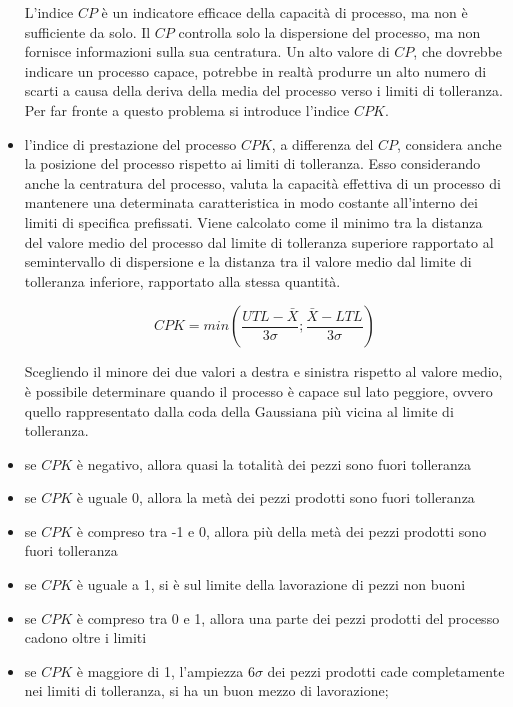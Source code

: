 \begin{itemize}
L'indice $CP$ è un indicatore efficace della capacità di processo, ma non è sufficiente da solo. 
Il $CP$ controlla solo la dispersione del processo, ma non fornisce informazioni sulla sua centratura. 
Un alto valore di $CP$, che dovrebbe indicare un processo capace, potrebbe in realtà produrre un alto numero di scarti a causa della deriva della media del processo verso i limiti di tolleranza.
Per far fronte a questo problema si introduce l'indice $CPK$.
\cite{qualityi}

\item l'indice di prestazione del processo $CPK$, a differenza del $CP$, considera anche la posizione del processo rispetto ai limiti di tolleranza. Esso considerando anche la centratura del processo, valuta la capacità effettiva di un processo di mantenere una determinata caratteristica in modo costante all'interno dei limiti di specifica prefissati.
Viene calcolato come il minimo tra la distanza del valore medio del processo dal limite di tolleranza superiore rapportato al semintervallo di dispersione e la distanza tra il valore medio dal limite di tolleranza inferiore, rapportato alla stessa quantità. 
\cite{SixSigma}


\begin{equation}CPK = min\left(\frac{UTL-\bar{X}}{3\sigma} ; 
\frac{\bar{X}-LTL}{3\sigma}\right)
\label {eqn: CPK}
\end{equation}

Scegliendo il minore dei due valori a destra e sinistra rispetto al valore medio, è possibile determinare quando il processo è capace sul lato peggiore, ovvero quello rappresentato dalla coda della Gaussiana più vicina al limite di tolleranza. 
\end{itemize}

\begin{itemize}
\item se $CPK$ è negativo, allora quasi la totalità dei pezzi sono fuori tolleranza
\item se $CPK$ è uguale 0, allora la metà dei pezzi prodotti sono fuori tolleranza
\item se $CPK$ è compreso tra -1 e 0, allora più della metà dei pezzi prodotti sono fuori tolleranza
\item se $CPK$ è uguale a 1, si è sul limite della lavorazione di pezzi non buoni
\item se $CPK$ è compreso tra 0 e 1, allora una parte dei pezzi prodotti del processo cadono oltre i limiti
\item se $CPK$ è maggiore di 1, l'ampiezza $\mathit{6\sigma}$ dei pezzi prodotti cade completamente nei limiti di tolleranza, si ha un buon mezzo di lavorazione;
\end{itemize}
\cite{qualityi}


